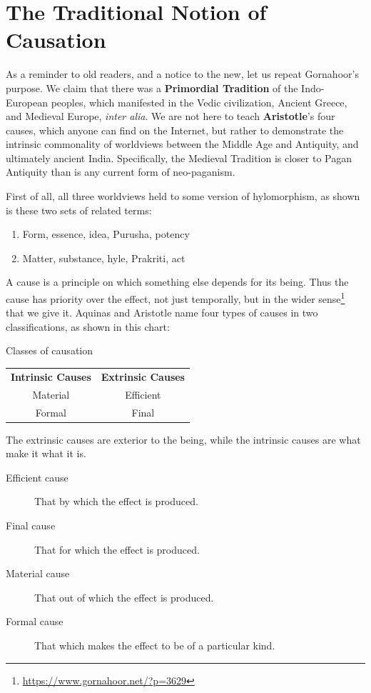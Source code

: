 \section{The Traditional Notion of Causation}

As a reminder to old readers, and a notice to the new, let us repeat Gornahoor's purpose. We claim that there was a \textbf{Primordial Tradition} of the Indo-European peoples, which manifested in the Vedic civilization, Ancient Greece, and Medieval Europe, \emph{inter alia}. We are not here to teach \textbf{Aristotle}'s four causes, which anyone can find on the Internet, but rather to demonstrate the intrinsic commonality of worldviews between the Middle Age and Antiquity, and ultimately ancient India. Specifically, the Medieval Tradition is closer to Pagan Antiquity than is any current form of neo-paganism.

First of all, all three worldviews held to some version of hylomorphism, as shown is these two sets of related terms:

\begin{enumerate}
\item Form, essence, idea, Purusha, potency 
\item Matter, substance, hyle, Prakriti, act 
\end{enumerate}

A cause is a principle on which something else depends for its being. Thus the cause has priority over the effect, not just temporally, but in the wider sense\footnote{\url{https://www.gornahoor.net/?p=3629}} that we give it. Aquinas and Aristotle name four types of causes in two classifications, as shown in this chart:

Classes of causation

\begin{table}[h]
\begin{tabular}{cc}
\textbf{Intrinsic Causes} &
\textbf{Extrinsic Causes}\\
Material &
Efficient\\
Formal &
Final\\
\end{tabular}
\end{table}
The extrinsic causes are exterior to the being, while the intrinsic causes are what make it what it is.

\begin{description}
\item[Efficient cause ] That by which the effect is produced. 
\item[Final cause ] That for which the effect is produced. 
\item[Material cause ] That out of which the effect is produced. 
\item[Formal cause ] That which makes the effect to be of a particular kind. 

\end{description}


